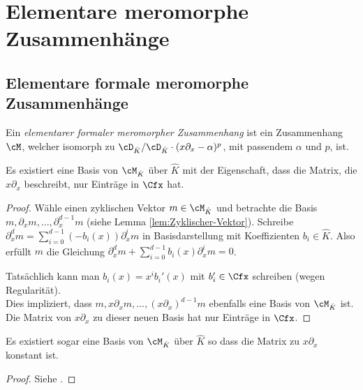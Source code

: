 \chapter{Elementare meromorphe Zusammenhänge}
\section{Elementare formale meromorphe Zusammenhänge}
\begin{defn}
Ein \emph{elementarer formaler meromorpher Zusammenhang} ist ein Zusammenhang
$\cM$, welcher isomorph zu $\cD_{\hat K}/\cD_{\hat K}\cdot
(x\partial_x-\alpha)^p$, mit passendem $\alpha$ und $p$, ist.
\end{defn}

\begin{lem}
Es existiert eine Basis von $\cM_{\hat K}$ über $\hat K$ mit der Eigenschaft,
dass die Matrix, die $x\partial_x$ beschreibt, nur Einträge in $\Cfx$ hat.
\end{lem}
\begin{comment}
\cite[Lem 5.2.1.]{sabbah_cimpa90}
\end{comment}
\begin{proof}
Wähle einen zyklischen Vektor $m\in\cM_{\hat K}$ %
 und betrachte die Basis $m,\partial_x m,\dots,\partial_x^{d-1}m$ (siehe Lemma
\ref{lem:Zyklischer-Vektor}).
Schreibe $\partial_x^dm=\sum_{i=0}^{d-1}(-b_i(x))\partial_x^im$ in
Basisdarstellung mit Koeffizienten $b_i\in\hat K$.
Also erfüllt $m$ die Gleichung
$\partial_x^dm+\sum_{i=0}^{d-1}b_i(x)\partial_x^im=0$.\\
\begin{comment} TODO: bis hier schon klar \end{comment}
Tatsächlich kann man $b_i(x)=x^ib_i'(x)$ mit $b_i'\in \Cfx$ schreiben (wegen
Regularität).\\
Dies impliziert, dass $m,x\partial_xm,\dots,(x\partial_x)^{d-1}m$ ebenfalls
eine Basis von $\cM_{\hat K}$ ist.\\
Die Matrix von $x\partial_x$ zu dieser neuen Basis hat nur Einträge in $\Cfx$.
\end{proof}
\begin{lem}
Es existiert sogar eine Basis von $\cM_{\hat K}$ über $\hat K$ so dass die
Matrix zu $x\partial_x$ konstant ist.
\end{lem}
\begin{proof}
Siehe \cite[Thm 5.2.2]{sabbah_cimpa90}.
\end{proof}

